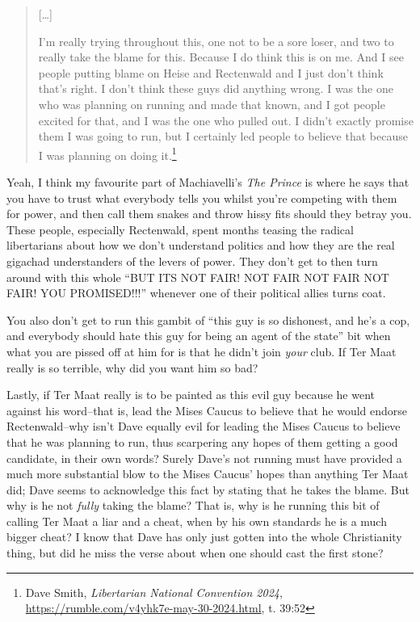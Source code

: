 \documentclass[11pt]{article}
\begin{document}
\begin{quote}
{[}\ldots{}]

I'm really trying throughout this, one not to be a sore loser, and two to really take the blame for this. Because I do think this is on me. And I see people putting blame on Heise and Rectenwald and I just don't think that's right. I don't think these guys did anything wrong. I was the one who was planning on running and made that known, and I got people excited for that, and I was the one who pulled out. I didn't exactly promise them I was going to run, but I certainly led people to believe that because I was planning on doing it.\footnote{Dave Smith, \emph{Libertarian National Convention 2024}, \url{https://rumble.com/v4yhk7e-may-30-2024.html}, t. 39:52}
\end{quote}

Yeah, I think my favourite part of Machiavelli's \emph{The Prince} is where he says that you have to trust what everybody tells you whilst you're competing with them for power, and then call them snakes and throw hissy fits should they betray you. These people, especially Rectenwald, spent months teasing the radical libertarians about how we don't understand politics and how they are the real gigachad understanders of the levers of power. They don't get to then turn around with this whole ``BUT ITS NOT FAIR! NOT FAIR NOT FAIR NOT FAIR! YOU PROMISED!!!'' whenever one of their political allies turns coat.

You also don't get to run this gambit of ``this guy is so dishonest, and he's a cop, and everybody should hate this guy for being an agent of the state'' bit when what you are pissed off at him for is that he didn't join \emph{your} club. If Ter Maat really is so terrible, why did you want him so bad?

Lastly, if Ter Maat really is to be painted as this evil guy because he went against his word--that is, lead the Mises Caucus to believe that he would endorse Rectenwald--why isn't Dave equally evil for leading the Mises Caucus to believe that he was planning to run, thus scarpering any hopes of them getting a good candidate, in their own words? Surely Dave's not running must have provided a much more substantial blow to the Mises Caucus' hopes than anything Ter Maat did; Dave seems to acknowledge this fact by stating that he takes the blame. But why is he not \emph{fully} taking the blame? That is, why is he running this bit of calling Ter Maat a liar and a cheat, when by his own standards he is a much bigger cheat? I know that Dave has only just gotten into the whole Christianity thing, but did he miss the verse about when one should cast the first stone?
\end{document}
